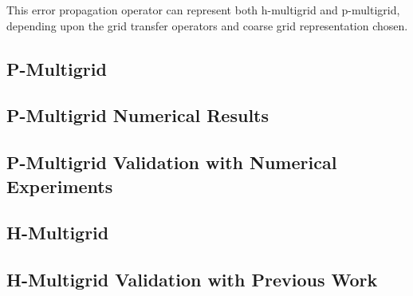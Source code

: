 This error propagation operator can represent both h-multigrid and p-multigrid, depending upon the grid transfer operators and coarse grid representation chosen.

\subsection{P-Multigrid}


\subsection{P-Multigrid Numerical Results}


\subsection{P-Multigrid Validation with Numerical Experiments}


\subsection{H-Multigrid}


\subsection{H-Multigrid Validation with Previous Work}

